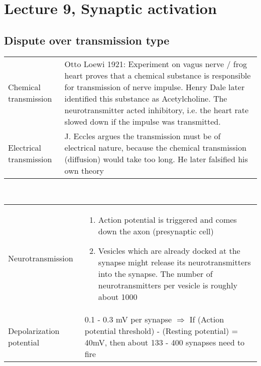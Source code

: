 \section{Lecture 9, Synaptic activation}
\subsection{Dispute over transmission type}
\begin{tabular}{p{4cm}p{15cm}}
Chemical transmission	& Otto Loewi 1921: Experiment on vagus nerve / frog heart proves that a chemical substance is responsible for transmission of nerve impulse. Henry Dale later identified this substance as Acetylcholine. The neurotransmitter acted inhibitory, i.e. the heart rate slowed down if the impulse was transmitted.\\
Electrical transmission	& J. Eccles argues the transmission must be of electrical nature, because the chemical transmission (diffusion) would take too long. He later falsified his own theory\\
\end{tabular}\\
\begin{tabular}{p{4cm}p{15cm}}
Neurotransmission	& \begin{enumerate}
                 	  	\item Action potential is triggered and comes down the axon (presynaptic cell)
				\item Vesicles which are already docked at the synapse might release its neurotransmitters into the synapse.\newline
				      The number of neurotransmitters per vesicle is roughly about 1000
                 	  \end{enumerate}\\
Depolarization potential	& 0.1 - 0.3 mV per synapse $\Rightarrow$ If (Action potential threshold) - (Resting potential) = 40mV, then about 133 - 400 synapses need to fire\\
\end{tabular}\\
